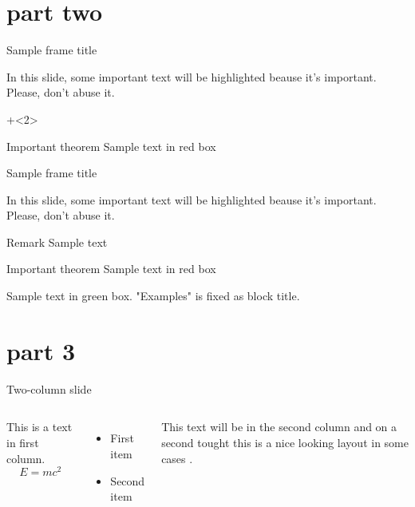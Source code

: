 \documentclass[11pt,aspectratio=1610]{beamer}	%
\begin{document}
\section{part two}

\begin{frame}[t]{Sample frame title}{}
	
	In this slide, some important text will be
	\alert<2->{highlighted} beause it's important.
	Please, don't abuse it.
	
	
	
	\onslide+<2>{	%
	\begin{alertblock}{Important theorem}
	Sample text in red box
	\end{alertblock}
	}
	
\end{frame}

\begin{frame}[plain]{Sample frame title}{}
	
	In this slide, some important text will be
	\alert{highlighted} beause it's important.
	Please, don't abuse it.
	
	\begin{block}{Remark}
	Sample text
	\end{block}
	
	\begin{alertblock}{Important theorem}
	Sample text in red box
	\end{alertblock}
	
	\begin{examples}
	Sample text in green box. "Examples" is fixed as block title.
	\end{examples}
\end{frame}

\section{part 3}

\begin{frame}{Two-column slide}{}
	\begin{columns}[t]
		This is a text in first column.
		$$E=mc^2$$
		\begin{itemize}
		\item First item
		\item Second item
		\end{itemize}
		
		This text will be in the second column
		and on a second tought this is a nice looking
		layout in some cases \citep{Venzmer2018}.
	\end{columns}
\end{frame}
\end{document}

